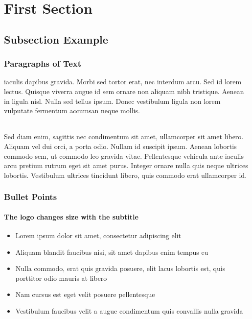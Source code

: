 \documentclass{beamer}
\begin{document}
\section{First Section} %

\subsection{Subsection Example} %

\begin{frame}
\frametitle{Paragraphs of Text}
{iaculis dapibus gravida. Morbi sed tortor erat, nec interdum arcu. Sed id lorem lectus. Quisque viverra augue id sem ornare non aliquam nibh tristique. Aenean in ligula nisl. Nulla sed tellus ipsum. Donec vestibulum ligula non lorem vulputate fermentum accumsan neque mollis.\\~\\}

Sed diam enim, sagittis nec condimentum sit amet, ullamcorper sit amet libero. Aliquam vel dui orci, a porta odio. Nullam id suscipit ipsum. Aenean lobortis commodo sem, ut commodo leo gravida vitae. Pellentesque vehicula ante iaculis arcu pretium rutrum eget sit amet purus. Integer ornare nulla quis neque ultrices lobortis. Vestibulum ultrices tincidunt libero, quis commodo erat ullamcorper id.
\end{frame}


\begin{frame}
\frametitle{Bullet Points}
\framesubtitle{The logo changes size with the subtitle}
\begin{itemize}
\item Lorem ipsum dolor sit amet, consectetur adipiscing elit
\item Aliquam blandit faucibus nisi, sit amet dapibus enim tempus eu
\item Nulla commodo, erat quis gravida posuere, elit lacus lobortis est, quis porttitor odio mauris at libero
\item Nam cursus est eget velit posuere pellentesque
\item Vestibulum faucibus velit a augue condimentum quis convallis nulla gravida
\end{itemize}
\end{frame}
\end{document}
